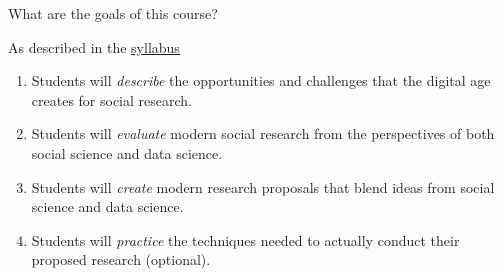 \documentclass{beamer}
\begin{document}
\begin{frame}

\begin{center}
\LARGE{What are the goals of this course?}
\end{center}

\end{frame}
\begin{frame}

As described in the \textcolor{blue}{\href{http://www.princeton.edu/~mjs3/soc596_f2016/}{syllabus}}
\pause
\begin{enumerate}
\item Students will \emph{describe} the opportunities and challenges that the digital age creates for social research.
\pause
\item Students will \emph{evaluate} modern social research from the perspectives of both social science and data science.
\pause
\item Students will \emph{create} modern research proposals that blend ideas from social science and data science.
\pause
\item Students will \emph{practice} the techniques needed to actually conduct their proposed research (optional).
\end{enumerate}
 
\end{frame}
\begin{frame}


\end{frame}
\end{document}
\end{frame}
\end{document}
